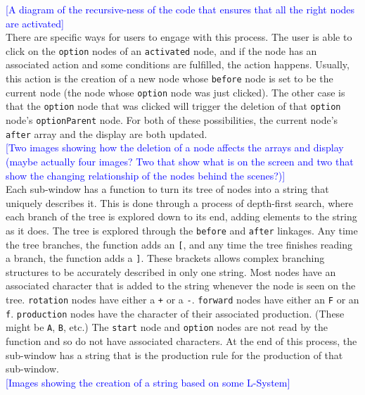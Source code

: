 \documentclass[12pt,twoside]{reedthesis}
\newcommand{\code}[1]{\texttt{#1}}
\begin{document}
	\textcolor{blue}{[A diagram of the recursive-ness of the code that ensures that all the right nodes are activated]}\\
	
	There are specific ways for users to engage with this process. The user is able to click on the \code{option} nodes of an \code{activated} node, and if the node has an associated action and some conditions are fulfilled, the action happens. Usually, this action is the creation of a new node whose \code{before} node is set to be the current node (the node whose \code{option} node was just clicked). The other case is that the \code{option} node that was clicked will trigger the deletion of that \code{option} node's \code{optionParent} node. For both of these possibilities, the current node's \code{after} array and the display are both updated.\\
	
	\textcolor{blue}{[Two images showing how the deletion of a node affects the arrays and display (maybe actually four images? Two that show what is on the screen and two that show the changing relationship of the nodes behind the scenes?)]}\\
	
	 Each sub-window has a function to turn its tree of nodes into a string that uniquely describes it. This is done through a process of depth-first search, where each branch of the tree is explored down to its end, adding elements to the string as it does. The tree is explored through the \code{before} and \code{after} linkages. Any time the tree branches, the function adds an \code{[}, and any time the tree finishes reading a branch, the function adds a \code{]}. These brackets allows complex branching structures to be accurately described in only one string. Most nodes have an associated character that is added to the string whenever the node is seen on the tree. \code{rotation} nodes have either a \code{+} or a \code{-}. \code{forward} nodes have either an \code{F} or an \code{f}. \code{production} nodes have the character of their associated production. (These might be \code{A}, \code{B}, etc.) The \code{start} node and \code{option} nodes are not read by the function and so do not have associated characters. At the end of this process, the sub-window has a string that is the production rule for the production of that sub-window.\\
	 
	 \textcolor{blue}{[Images showing the creation of a string based on some L-System]}\\
	
\end{document}
